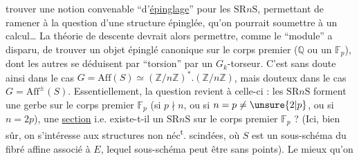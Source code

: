 trouver une notion convenable  ``d'\uline{épinglage}''
pour les $\mathrm{SR}n\mathrm{S}$, permettant de  ramener
à la question d'une structure épinglée, qu'on
pourrait soumettre à un calcul\ldots{} La théorie
de descente devrait alors permettre, 
 comme le ``module'' a disparu,
de  trouver un objet épinglé
canonique sur le corps premier ($\mathbb{Q}$ ou
un $\mathbb{F}_p$), dont les autres se déduisent
par ``torsion'' par un  $G_k$-torseur.
C'est sans doute ainsi dans le cas  $G=\mathrm{Aff}(S)\simeq
(\mathbb{Z}/n\mathbb{Z})^*.(\mathbb{Z}/n\mathbb{Z})$, mais douteux dans le
cas $G=\mathrm{Aff}^{\pm}(S)$. Essentiellement, la question
revient à celle-ci : les $\mathrm{SR}n\mathrm{S}$  forment
une gerbe sur le corps premier $\mathbb{F}_p$
(si  $p\nmid n$, ou si $n=p\ne\unsure{2|p}$,  ou si
$n=2p$),   une \uline{section} i.e.
existe-t-il un $\mathrm{SR}n\mathrm{S}$ sur le corps
premier $\mathbb{F}_p$ ? (Ici, bien sûr, on s'intéresse
aux structures non néc\textsuperscript{t}. scindées, où
 $S$ est un sous-schéma du fibré affine
associé à $E$, lequel sous-schéma peut
être sans points). Le mieux qu'on
